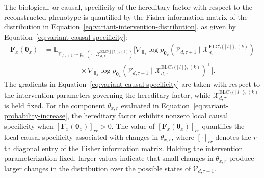 \documentclass[pdflatex,sn-mathphys-num]{sn-jnl}
\theoremstyle{thmstylethree}
\theoremstyle{thmstyleone}
\newcommand{\ELC}{\mathrm{ELC}}
\begin{document}
The biological, or causal, specificity of the hereditary factor with respect to the reconstructed phenotype is quantified by the Fisher information matrix of the distribution in Equation~\eqref{eq:variant-intervention-distribution}, as given by Equation~\eqref{eq:variant-causal-specificity}:
\begin{equation}
\label{eq:variant-causal-specificity}
\begin{aligned}
\mathbf{F}_{x}(\boldsymbol{\theta}_x)
&=
\mathbb{E}_{
\mathcal{V}_{d,\tau+1}
\sim
p_{\boldsymbol{\theta}_x}\left(
\cdot
\mid
\mathcal{X}_{d,\tau}^{\ELC\setminus\{[l]\},(k)}
\right)
}
\Bigg[
\nabla_{\boldsymbol{\theta}_x}
\log
p_{\boldsymbol{\theta}_x}\left(
\mathcal{V}_{d,\tau+1}
\mid
\mathcal{X}_{d,\tau}^{\ELC\setminus\{[l]\},(k)}
\right)
\\
&\qquad\qquad\quad
\times
\nabla_{\boldsymbol{\theta}_x}
\log
p_{\boldsymbol{\theta}_x}\left(
\mathcal{V}_{d,\tau+1}
\mid
\mathcal{X}_{d,\tau}^{\ELC\setminus\{[l]\},(k)}
\right)^{\top}
\Bigg].
\end{aligned}
\end{equation}
The gradients in Equation~\eqref{eq:variant-causal-specificity} are taken with respect to the intervention parameters governing the hereditary factor, while $\mathcal{X}_{d,\tau}^{\ELC\setminus\{[l]\},(k)}$ is held fixed. For the component $\theta_{x,r}$ evaluated in Equation~\eqref{eq:variant-probability-increase}, the hereditary factor exhibits nonzero local causal specificity when
$
\left[
\mathbf{F}_{x}(\boldsymbol{\theta}_x)
\right]_{rr}
>0$.
The value of $\left[\mathbf{F}_{x}(\boldsymbol{\theta}_x)\right]_{rr}$ quantifies the local causal specificity associated with changes in $\theta_{x,r}$, where $[\cdot]_{rr}$ denotes the $r$th diagonal entry of the Fisher information matrix. Holding the intervention parameterization fixed, larger values indicate that small changes in $\theta_{x,r}$ produce larger changes in the distribution over the possible states of $\mathcal{V}_{d,\tau+1}$.
\end{document}
